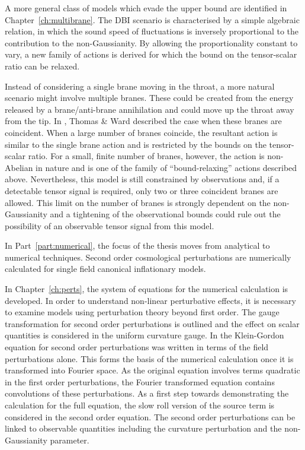 A more general class of models which evade the upper bound are identified in
Chapter~\ref{ch:multibrane}. The DBI scenario is characterised by a simple
algebraic relation, in which the sound speed of fluctuations is inversely
proportional to the contribution to the non-Gaussianity. By allowing the
proportionality constant to vary, a new family of actions is derived for which the
bound on the tensor-scalar ratio can be relaxed. 

Instead of considering a single brane moving in the throat, a more natural scenario
might involve multiple branes. These could be created from the energy released by a
brane/anti-brane annihilation and could move up the throat away from the tip.
In , Thomas \& Ward described the case when these branes are
coincident. When a large number of branes coincide, the resultant action is similar
to the single brane action and is restricted by the bounds on the tensor-scalar
ratio. For a small, finite number of branes, however, the action is non-Abelian in
nature and is one of the family of ``bound-relaxing'' actions described above.
Nevertheless, this model is still constrained by observations and, if a detectable
tensor signal is required, only two or three coincident branes
are allowed. This limit on the number of branes is strongly dependent on the
non-Gaussianity and a tightening of the observational bounds could rule out the
possibility of an observable tensor signal from this model.


In Part~\ref{part:numerical}, the focus of the thesis moves from analytical to
numerical
techniques. Second order cosmological perturbations are numerically calculated for
single field canonical inflationary models.

In Chapter~\ref{ch:perts}, the system of equations for the numerical calculation is
developed. In order to understand non-linear perturbative effects, it is necessary to
examine models using perturbation theory beyond first order. The gauge
transformation for second order perturbations is outlined and the effect on
scalar quantities is considered in the uniform curvature gauge. In
 the Klein-Gordon equation for second order perturbations was
written in terms of the field perturbations alone. This forms the basis of the
numerical calculation once it is transformed into Fourier space. As the original
equation involves terms quadratic in the first order perturbations, the Fourier
transformed equation contains convolutions of these perturbations. As a first step
towards demonstrating the calculation for the full equation, the slow roll version of
the source term is considered in the second order equation. The second order
perturbations can be linked to observable quantities including the curvature
perturbation and the non-Gaussianity parameter.



